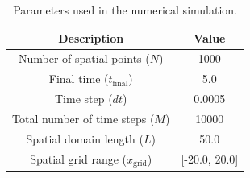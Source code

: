 \documentclass[8pt, a4paper, twocolumn]{article}
\begin{document}
\begin{table}[h!]
	\centering
	\begin{tabular}{c|c}
	\toprule
	\textbf{Description} & \textbf{Value}     \\ 
	\midrule
	Number of spatial points ($N$)              & 1000              \\ 
	Final time ($t_{\text{final}}$)             & 5.0               \\ 
	Time step ($dt$)                            & 0.0005            \\ 
	Total number of time steps ($M$)            & 10000             \\ 
	Spatial domain length ($L$)                 & 50.0              \\ 
	Spatial grid range ($x_{\text{grid}}$)      & [-20.0, 20.0]     \\
	\bottomrule
	\end{tabular}
	\caption{Parameters used in the numerical simulation.}
\end{table}
\end{document}

